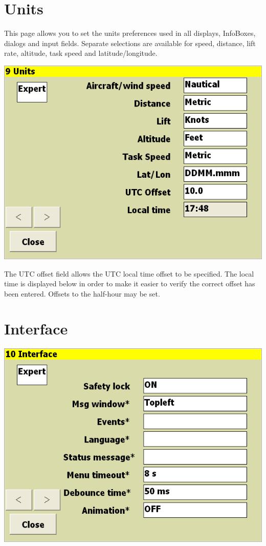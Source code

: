 \documentclass[a4paper,12pt]{refrep}
\newcommand{\InfoBox}[0]{{InfoBox}}
\begin{document}
\clearpage
\section{Units}

This page allows you to set the units preferences used in all
displays, {\InfoBox}es, dialogs and input fields.  Separate selections
are available for speed, distance, lift rate, altitude, task
speed and latitude/longitude.

\begin{center}
\includegraphics[angle=0,width=\linewidth,keepaspectratio='true']{figures/config-7.png}
\end{center}

The UTC offset field allows the UTC local time offset to be specified.
The local time is displayed below in order to make it easier to verify
the correct offset has been entered.  Offsets to the half-hour may be
set.


\clearpage
\section{Interface}

\begin{center}
\includegraphics[angle=0,width=\linewidth,keepaspectratio='true']{figures/config-8.png}
\end{center}
\end{document}
